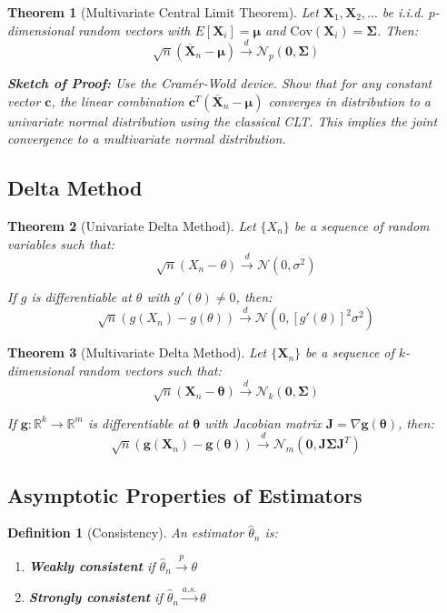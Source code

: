 \documentclass[12pt,a4paper]{article}
\newtheorem{theorem}{Theorem}[section]
\newtheorem{definition}{Definition}[section]
\theoremstyle{remark}
\begin{document}
\begin{theorem}[Multivariate Central Limit Theorem]
Let $\mathbf{X}_1, \mathbf{X}_2, \ldots$ be i.i.d. $p$-dimensional random vectors with $E[\mathbf{X}_i] = \boldsymbol{\mu}$ and $\text{Cov}(\mathbf{X}_i) = \boldsymbol{\Sigma}$. Then:
$$\sqrt{n}(\overline{\mathbf{X}}_n - \boldsymbol{\mu}) \stackrel{d}{\to} \mathcal{N}_p(\mathbf{0}, \boldsymbol{\Sigma})$$

\textbf{Sketch of Proof:} Use the Cramér-Wold device. Show that for any constant vector $\mathbf{c}$, the linear combination $\mathbf{c}^T(\overline{\mathbf{X}}_n - \boldsymbol{\mu})$ converges in distribution to a univariate normal distribution using the classical CLT. This implies the joint convergence to a multivariate normal distribution.
\end{theorem}
\subsection{Delta Method}

\begin{theorem}[Univariate Delta Method]
Let $\{X_n\}$ be a sequence of random variables such that:
$$\sqrt{n}(X_n - \theta) \stackrel{d}{\to} \mathcal{N}(0, \sigma^2)$$

If $g$ is differentiable at $\theta$ with $g'(\theta) \neq 0$, then:
$$\sqrt{n}(g(X_n) - g(\theta)) \stackrel{d}{\to} \mathcal{N}(0, [g'(\theta)]^2 \sigma^2)$$
\end{theorem}

\begin{theorem}[Multivariate Delta Method]
Let $\{\mathbf{X}_n\}$ be a sequence of $k$-dimensional random vectors such that:
$$\sqrt{n}(\mathbf{X}_n - \boldsymbol{\theta}) \stackrel{d}{\to} \mathcal{N}_k(\mathbf{0}, \boldsymbol{\Sigma})$$

If $\mathbf{g}: \mathbb{R}^k \to \mathbb{R}^m$ is differentiable at $\boldsymbol{\theta}$ with Jacobian matrix $\mathbf{J} = \nabla\mathbf{g}(\boldsymbol{\theta})$, then:
$$\sqrt{n}(\mathbf{g}(\mathbf{X}_n) - \mathbf{g}(\boldsymbol{\theta})) \stackrel{d}{\to} \mathcal{N}_m(\mathbf{0}, \mathbf{J}\boldsymbol{\Sigma}\mathbf{J}^T)$$
\end{theorem}

\subsection{Asymptotic Properties of Estimators}

\begin{definition}[Consistency]
An estimator $\hat{\theta}_n$ is:
\begin{enumerate}
\item \textbf{Weakly consistent} if $\hat{\theta}_n \stackrel{p}{\to} \theta$
\item \textbf{Strongly consistent} if $\hat{\theta}_n \stackrel{a.s.}{\to} \theta$
\end{enumerate}
\end{definition}
\end{document}
